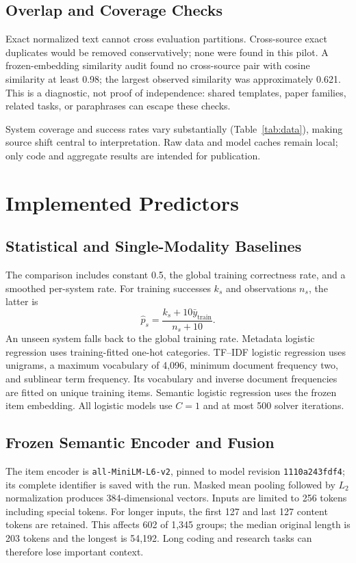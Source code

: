 \documentclass[conference]{IEEEtran}
\begin{document}
\subsection{Overlap and Coverage Checks}
Exact normalized text cannot cross evaluation partitions. Cross-source exact duplicates would be removed conservatively; none were found in this pilot. A frozen-embedding similarity audit found no cross-source pair with cosine similarity at least 0.98; the largest observed similarity was approximately 0.621. This is a diagnostic, not proof of independence: shared templates, paper families, related tasks, or paraphrases can escape these checks.

System coverage and success rates vary substantially (Table~\ref{tab:data}), making source shift central to interpretation. Raw data and model caches remain local; only code and aggregate results are intended for publication.

\section{Implemented Predictors}
\subsection{Statistical and Single-Modality Baselines}
The comparison includes constant 0.5, the global training correctness rate, and a smoothed per-system rate. For training successes $k_s$ and observations $n_s$, the latter is
\begin{equation}
\hat p_s=\frac{k_s+10\bar y_{\mathrm{train}}}{n_s+10}.
\end{equation}
An unseen system falls back to the global training rate. Metadata logistic regression uses training-fitted one-hot categories. TF--IDF logistic regression uses unigrams, a maximum vocabulary of 4,096, minimum document frequency two, and sublinear term frequency. Its vocabulary and inverse document frequencies are fitted on unique training items. Semantic logistic regression uses the frozen item embedding. All logistic models use $C=1$ and at most 500 solver iterations.

\subsection{Frozen Semantic Encoder and Fusion}
The item encoder is \texttt{all-MiniLM-L6-v2}, pinned to model revision \texttt{1110a243fdf4}; its complete identifier is saved with the run. Masked mean pooling followed by $L_2$ normalization produces 384-dimensional vectors. Inputs are limited to 256 tokens including special tokens. For longer inputs, the first 127 and last 127 content tokens are retained. This affects 602 of 1,345 groups; the median original length is 203 tokens and the longest is 54,192. Long coding and research tasks can therefore lose important context.
\end{document}
